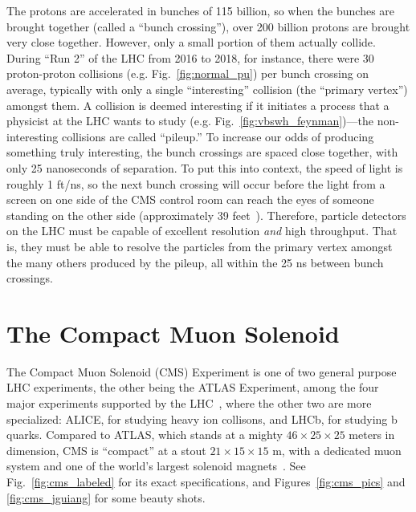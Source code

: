 The protons are accelerated in bunches of 115 billion, so when the bunches are brought together (called a ``bunch crossing''), over 200 billion protons are brought very close together.
However, only a small portion of them actually collide. 
During ``Run 2'' of the LHC from 2016 to 2018, for instance, there were 30 proton-proton collisions (e.g. Fig.~\ref{fig:normal_pu}) per bunch crossing on average, typically with only a single ``interesting'' collision (the ``primary vertex'') amongst them. %
A collision is deemed interesting if it initiates a process that a physicist at the LHC wants to study (e.g. Fig.~\ref{fig:vbswh_feynman})---the non-interesting collisions are called ``pileup.'' 
To increase our odds of producing something truly interesting, the bunch crossings are spaced close together, with only 25 nanoseconds of separation. 
To put this into context, the speed of light is roughly 1 ft/ns, so the next bunch crossing will occur before the light from a screen on one side of the CMS control room can reach the eyes of someone standing on the other side (approximately 39 feet~\cite{CMSP5Layout}).
Therefore, particle detectors on the LHC must be capable of excellent resolution \textit{and} high throughput. 
That is, they must be able to resolve the particles from the primary vertex amongst the many others produced by the pileup, all within the 25 ns between bunch crossings. 

\clearpage

\section{The Compact Muon Solenoid}
The Compact Muon Solenoid (CMS) Experiment is one of two general purpose LHC experiments, the other being the ATLAS\footnotemark{} Experiment, among the four major experiments supported by the LHC~\cite{LHCWeb}, where the other two are more specialized: ALICE, for studying heavy ion collisons, and LHCb, for studying b quarks. 
Compared to ATLAS, which stands at a mighty $46\times25\times25$ meters in dimension, CMS is ``compact'' at a stout $21\times15\times15$ m, with a dedicated muon system and one of the world's largest solenoid magnets~\cite{ATLASWeb, CMSWeb}. 
See Fig.~\ref{fig:cms_labeled} for its exact specifications, and Figures~\ref{fig:cms_pics} and \ref{fig:cms_jguiang} for some beauty shots. 

